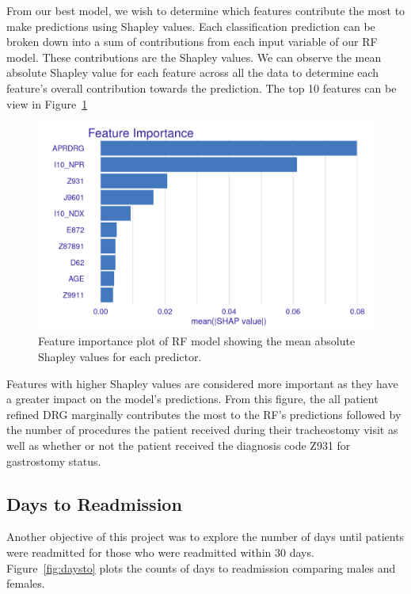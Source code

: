 \documentclass[sn-basic,pdflatex]{sn-jnl}
\theoremstyle{remark}
\theoremstyle{definition}
\begin{document}
From our best model, we wish to determine which features contribute the
most to make predictions using Shapley values. Each classification
prediction can be broken down into a sum of contributions from each
input variable of our RF model. These contributions are the Shapley
values. We can observe the mean absolute Shapley value for each feature
across all the data to determine each feature's overall contribution
towards the prediction. The top 10 features can be view in
Figure~\ref{fig:rf_imp}

\begin{figure}[H]

{\centering \includegraphics[width=1\linewidth]{figures/rf_imp} 

}

\caption{Feature importance plot of RF model showing the mean absolute Shapley values for each predictor.}\label{fig:rf_imp}
\end{figure}

Features with higher Shapley values are considered more important as
they have a greater impact on the model's predictions. From this figure,
the all patient refined DRG marginally contributes the most to the RF's
predictions followed by the number of procedures the patient received
during their tracheostomy visit as well as whether or not the patient
received the diagnosis code Z931 for gastrostomy status.

\hypertarget{sec4B}{%
\subsection{Days to Readmission}\label{sec4B}}

Another objective of this project was to explore the number of days
until patients were readmitted for those who were readmitted within 30
days. Figure~\ref{fig:daysto} plots the counts of days to readmission
comparing males and females. \newline
\end{document}
